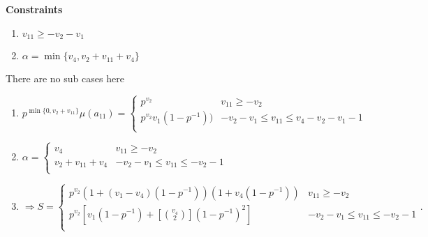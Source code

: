 \documentclass{article}
\begin{document}
\begin{enumerate}
    \textbf{Constraints}
    \begin{enumerate}
        \item $v_{11}\geq{-v_2-v_1}$
        \item $\alpha=\min\{v_4,v_2+v_{11}+v_4\}$
    \end{enumerate}
There are no sub cases here
        \begin{enumerate}
            \item $p^{\min\{0,v_2+v_{11}\}}\mu(a_{11})=
            \left\{
	\begin{array}{ll}
            p^{v_2} & v_{11}\geq{-v_2} \\
		  p^{v_2}v_1(1-p^{-1})) & -v_2-v_1\leq{v_{11}}\leq{v_4-v_2-v_1-1} \\
	\end{array}
\right.
$
            \item $\alpha=\left\{
	\begin{array}{ll}
            v_4  & v_{11}\geq{-v_2} \\
		  v_2+v_{11}+v_4 & -v_2-v_1\leq{v_{11}}\leq{-v_2-1} \\
	\end{array}
\right.$
        \item $\Rightarrow{S=\left\{
	\begin{array}{ll}
            p^{v_2}(1+(v_1-v_4)(1-p^{-1}))(1+v_4(1-p^{-1}))  & v_{11}\geq{-v_2} \\
		              p^{v_2}[v_1(1-p^{-1})+[\binom{v_4}{2}](1-p^{-1})^2]  & -v_2-v_1\leq{v_{11}}\leq{-v_2-1} \\
	\end{array}
\right.}.$
        \end{enumerate}
    \end{enumerate}
\end{document}
